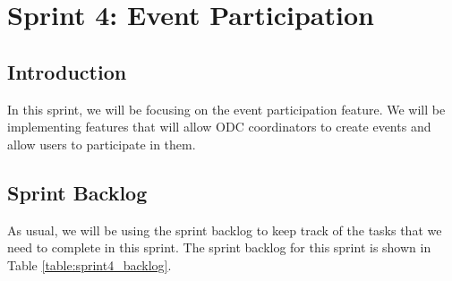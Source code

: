 \chapter{Sprint 4: Event Participation}

\section{Introduction}
In this sprint, we will be focusing on the event participation feature. We will be implementing features
that will allow ODC coordinators to create events and allow users to participate in them.

\section{Sprint Backlog}
As usual, we will be using the sprint backlog to keep track of the tasks that we need to complete in this sprint.
The sprint backlog for this sprint is shown in Table \ref{table:sprint4_backlog}.

